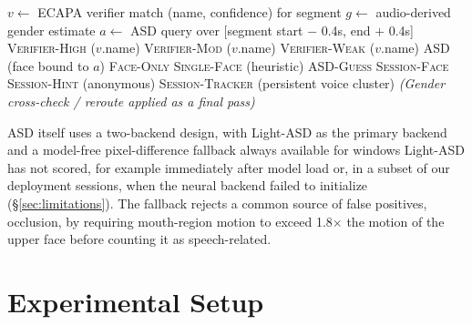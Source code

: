 \documentclass[conference,a4paper]{IEEEtran}
\begin{document}
\begin{algorithm}[h]
\caption{Speaker attribution cascade (simplified)}
\label{alg:cascade}
\begin{algorithmic}[1]
\State $v \gets$ ECAPA verifier match (name, confidence) for segment
\State $g \gets$ audio-derived gender estimate
\State $a \gets$ ASD query over [segment start $-$ 0.4s, end $+$ 0.4s]
  \State \Return \textsc{Verifier-High} ($v$.name)
  \State \Return \textsc{Verifier-Mod} ($v$.name)
  \State \Return \textsc{Verifier-Weak} ($v$.name)
  \State \Return \textsc{ASD} (face bound to $a$)
  \State \Return \textsc{Face-Only}
  \State \Return \textsc{Single-Face} (heuristic)
  \State \Return \textsc{ASD-Guess}
  \State \Return \textsc{Session-Face}
  \State \Return \textsc{Session-Hint} (anonymous)
\Else
  \State \Return \textsc{Session-Tracker} (persistent voice cluster)
\EndIf
\State \textit{(Gender cross-check / reroute applied as a final pass)}
\end{algorithmic}
\end{algorithm}

ASD itself uses a two-backend design, with Light-ASD
\cite{liao2023lightasd} as the primary backend and a model-free
pixel-difference fallback always available for windows Light-ASD has
not scored, for example immediately after model load or, in a subset
of our deployment sessions, when the neural backend failed to
initialize (\S\ref{sec:limitations}). The fallback rejects a common
source of false positives, occlusion, by requiring mouth-region motion
to exceed 1.8$\times$ the motion of the upper face before counting it
as speech-related.

\section{Experimental Setup}
\label{sec:setup}
\end{document}
